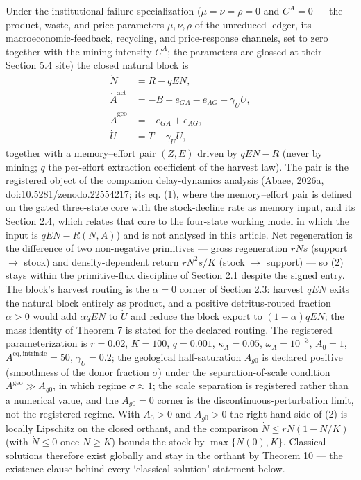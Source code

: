 \documentclass[11pt]{article}
\begin{document}
Under the institutional-failure specialization (\(\mu = \nu = \rho = 0\)
and \(C^A = 0\) --- the product, waste, and price parameters
\(\mu, \nu, \rho\) of the unreduced ledger, its macroeconomic-feedback,
recycling, and price-response channels, set to zero together with the
mining intensity \(C^A\); the parameters are glossed at their Section
5.4 site) the closed natural block is \[\begin{aligned}
\dot N &= R - qEN, \\
\dot A^{\mathrm{act}} &= -B + e_{GA} - e_{AG} + \gamma_U U, \\
\dot A^{\mathrm{geo}} &= -e_{GA} + e_{AG}, \\
\dot U &= T - \gamma_U U,
\end{aligned} \tag{2}\] together with a memory--effort pair \((Z, E)\)
driven by \(qEN - R\) (never by mining; \(q\) the per-effort extraction
coefficient of the harvest law). The pair is the registered object of
the companion delay-dynamics analysis (Abaee, 2026a, doi:10.5281/zenodo.22554217; its eq. (1), where the memory--effort pair is defined on the
gated three-state core with the stock-decline rate as memory input, and its Section 2.4, which relates that
core to the four-state working model in which the input is \(qEN - R(N, A)\)) and is not analysed in this
article. Net regeneration is the difference of two non-negative
primitives --- gross regeneration \(rNs\) (support \(\to\) stock) and
density-dependent return \(rN^2 s/K\) (stock \(\to\) support) --- so (2)
stays within the primitive-flux discipline of Section 2.1 despite the
signed entry. The block's harvest routing is the \(\alpha = 0\) corner
of Section 2.3: harvest \(qEN\) exits the natural block entirely as
product, and a positive detritus-routed fraction \(\alpha > 0\) would
add \(\alpha qEN\) to \(\dot U\) and reduce the block export to
\((1-\alpha)qEN\); the mass identity of Theorem 7 is stated for the
declared routing. The registered parameterization is \(r = 0.02\),
\(K = 100\), \(q = 0.001\), \(\kappa_A = 0.05\), \(\omega_A = 10^{-3}\),
\(A_0 = 1\), \(A^{\mathrm{eq,intrinsic}} = 50\), \(\gamma_U = 0.2\); the
geological half-saturation \(A_{g0}\) is declared positive (smoothness
of the donor fraction \(\sigma\)) under the separation-of-scale
condition \(A^{\mathrm{geo}} \gg A_{g0}\), in which regime
\(\sigma \approx 1\); the scale separation is registered rather than a
numerical value, and the \(A_{g0} = 0\) corner is the
discontinuous-perturbation limit, not the registered regime. With
\(A_0 > 0\) and \(A_{g0} > 0\) the right-hand side of (2) is locally
Lipschitz on the closed orthant, and the comparison
\(\dot N \le rN(1 - N/K)\) (with \(\dot N \le 0\) once \(N \ge K\))
bounds the stock by \(\max\{N(0), K\}\). Classical solutions therefore
exist globally and stay in the orthant by Theorem 10 --- the existence
clause behind every `classical solution' statement below.
\end{document}
